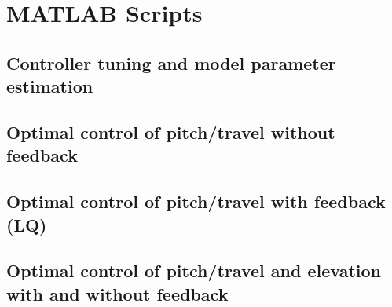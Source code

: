 \section{MATLAB Scripts}\label{text:matlab}

\subsection{Controller tuning and model parameter estimation}\label{code:sys_id}


\subsection{Optimal control of pitch/travel without feedback}\label{code:sys_id}


\subsection{Optimal control of pitch/travel with feedback (LQ)}\label{code:sys_id}


\subsection{Optimal control of pitch/travel and elevation with and without feedback}\label{code:sys_id}

